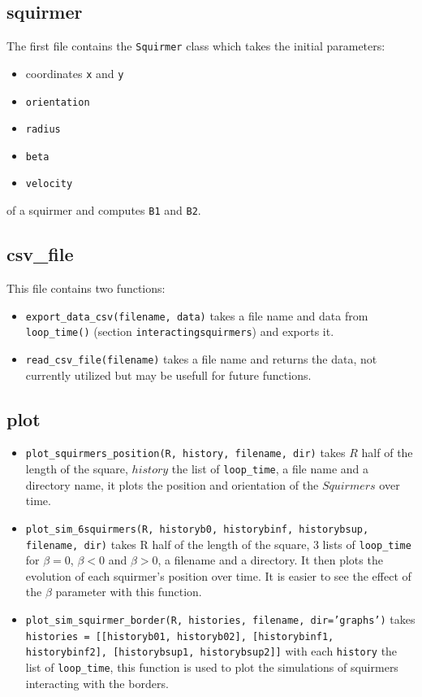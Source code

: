 \documentclass{article}
\begin{document}
\subsection{squirmer}
The first file contains the \texttt{Squirmer} class which takes the initial parameters: 
\begin{itemize}
   \item coordinates \texttt{x} and \texttt{y}
   \item \texttt{orientation}
   \item \texttt{radius}
   \item \texttt{beta}
   \item \texttt{velocity}
\end{itemize}
of a squirmer and computes \texttt{B1} and \texttt{B2}.

\subsection{csv\_file}
This file contains two functions:
\begin{itemize}
   \item \texttt{export\_data\_csv(filename, data)} takes a file name and data from \texttt{loop\_time()} (section \texttt{interactingsquirmers}) and exports it.
   \item \texttt{read\_csv\_file(filename)} takes a file name and returns the data, not currently utilized but may be usefull for future functions.
\end{itemize}

\subsection{plot}
\begin{itemize}
   \item \texttt{plot\_squirmers\_position(R, history, filename, dir)}
   takes $R$ half of the length of the square, $history$ the list of \texttt{loop\_time}, 
   a file name and a directory name, 
   it plots the position and orientation of the $Squirmers$ over time.
   \item \texttt{plot\_sim\_6squirmers(R, historyb0, historybinf, historybsup, filename, dir)} takes R half of the length of the square, 3 lists
   of \texttt{loop\_time} for $\beta=0$, $\beta<0$ and $\beta>0$, a filename and a directory.
   It then plots the evolution of each squirmer's position over time. It is easier to see the effect of the $\beta$ parameter with this function.
   \item \texttt{plot\_sim\_squirmer\_border(R, histories, filename, dir='graphs')} takes \texttt{histories = [[historyb01, historyb02], [historybinf1, historybinf2], [historybsup1, historybsup2]]}
   with each \texttt{history} the list of \texttt{loop\_time}, this function is used to plot the simulations of squirmers
   interacting with the borders.
\end{itemize}
\end{document}
